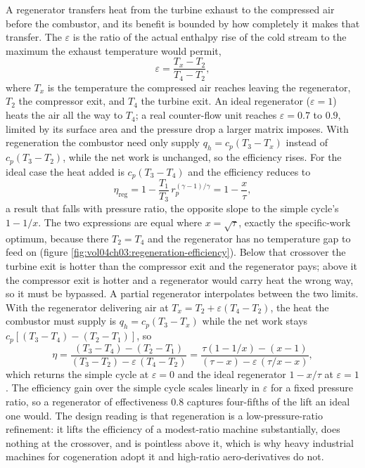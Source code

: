 A regenerator transfers heat from the turbine exhaust to the compressed air
before the combustor, and its benefit is bounded by how completely it makes
that transfer. The  $\varepsilon$ is the
ratio of the actual enthalpy rise of the cold stream to the maximum the
exhaust temperature would permit,
\[
\varepsilon = \frac{T_x - T_2}{T_4 - T_2},
\]
where $T_x$ is the temperature the compressed air reaches leaving the
regenerator, $T_2$ the compressor exit, and $T_4$ the turbine exit. An ideal
regenerator ($\varepsilon = 1$) heats the air all the way to $T_4$; a real
counter-flow unit reaches $\varepsilon = 0.7$ to $0.9$, limited by its
surface area and the pressure drop a larger matrix imposes. With
regeneration the combustor need only supply $q_h = c_p(T_3 - T_x)$ instead
of $c_p(T_3 - T_2)$, while the net work is unchanged, so the efficiency
rises. For the ideal case the heat added is $c_p(T_3 - T_4)$ and the
efficiency reduces to
\[
\eta_{\text{reg}} = 1 - \frac{T_1}{T_3}\,r_p^{(\gamma-1)/\gamma}
= 1 - \frac{x}{\tau},
\]
a result that falls with pressure ratio, the opposite slope to the simple
cycle's $1 - 1/x$. The two expressions are equal where $x = \sqrt{\tau}$,
exactly the specific-work optimum, because there $T_2 = T_4$ and the
regenerator has no temperature gap to feed on (figure
\ref{fig:vol04ch03:regeneration-efficiency}). Below that crossover the
turbine exit is hotter than the compressor exit and the regenerator pays;
above it the compressor exit is hotter and a regenerator would carry heat
the wrong way, so it must be bypassed. A partial regenerator interpolates
between the two limits. With the regenerator delivering air at $T_x = T_2 +
\varepsilon(T_4 - T_2)$, the heat the combustor must supply is $q_h =
c_p(T_3 - T_x)$ while the net work stays $c_p[(T_3 - T_4) - (T_2 - T_1)]$,
so
\[
\eta = \frac{(T_3 - T_4) - (T_2 - T_1)}
{(T_3 - T_2) - \varepsilon\,(T_4 - T_2)}
= \frac{\tau(1 - 1/x) - (x - 1)}
{(\tau - x) - \varepsilon\,(\tau/x - x)},
\]
which returns the simple cycle at $\varepsilon = 0$ and the ideal
regenerator $1 - x/\tau$ at $\varepsilon = 1$. The efficiency gain over the
simple cycle scales linearly in $\varepsilon$ for a fixed pressure ratio, so
a regenerator of effectiveness $0.8$ captures four-fifths of the lift an
ideal one would. The design reading is that regeneration is a
low-pressure-ratio refinement: it lifts the efficiency of a modest-ratio
machine substantially, does nothing at the crossover, and is pointless above
it, which is why heavy industrial machines for cogeneration adopt it and
high-ratio aero-derivatives do not.

